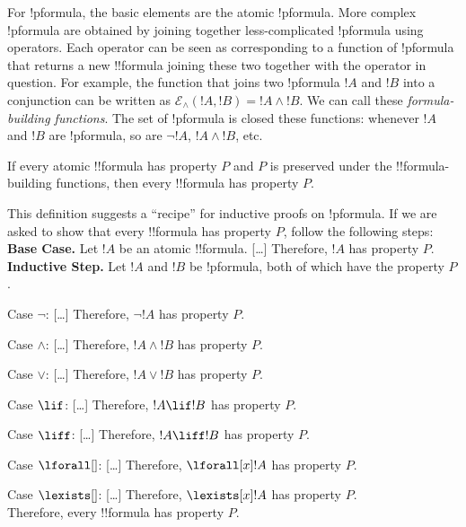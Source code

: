 \documentclass[../../include/open-logic-section]{subfiles}
\begin{document}
\begin{explain}
For !p{formula}, the basic elements are the atomic !p{formula}. More complex !p{formula} 
are obtained by joining together less-complicated !p{formula} using operators. Each 
operator can be seen as corresponding to a function of !p{formula} that returns a new 
!!{formula} joining these two together with the operator in question. For example, the function 
that joins two !p{formula} $!A$ and $!B$ into a conjunction can be written as $\mathcal E _\land 
(!A, !B) = !A \land !B$. We can call these \emph{formula-building functions}. The set of 
!p{formula} is closed these functions: whenever $!A$ and $!B$ are !p{formula}, so are 
$\lnot !A$, $!A \land !B$, etc. 
\end{explain}

\begin{defn}
If every atomic !!{formula} has property $P$ and $P$ is preserved under the !!{formula}-building 
functions, then every !!{formula} has property $P$.
\end{defn}

\begin{explain}
This definition suggests a ``recipe'' for inductive proofs on !p{formula}. If we are asked 
to show that every !!{formula} has property $P$, follow the following steps:\\

\textbf{Base Case.} Let $!A$ be an atomic !!{formula}. [\ldots] Therefore, $!A$ has 
property $P$.\\

\textbf{Inductive Step.} Let $!A$ and $!B$ be !p{formula}, both of which have the property $P$.

Case $\lnot$: [\ldots] Therefore, $\lnot !A$ has property $P$.

Case $\land$: [\ldots] Therefore, $!A \land !B$ has property $P$. 

Case $\lor$: [\ldots] Therefore, $!A \lor !B$ has property $P$. 

Case $\lif$: [\ldots] Therefore, $!A \lif !B$ has property $P$.

Case $\liff$: [\ldots] Therefore, $!A \liff !B$ has property $P$.

Case $\lforall[]$: [\ldots] Therefore, $\lforall[x] !A$ has property $P$.

Case $\lexists[]$: [\ldots] Therefore, $\lexists[x] !A$ has property $P$. \\

Therefore, every !!{formula} has property $P$.
\end{explain}
\end{document}
